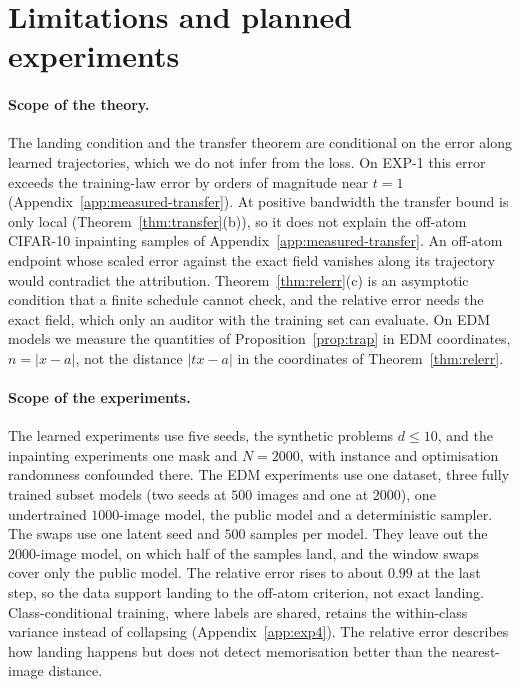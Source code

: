 \documentclass{article} %
\theoremstyle{plain}
\theoremstyle{definition}
\theoremstyle{remark}
\begin{document}
\FloatBarrier

\section{Limitations and planned experiments}
\label{sec:limitations}

\paragraph{Scope of the theory.} The landing condition and the transfer theorem are conditional on
the error along learned trajectories, which we do not infer from the loss. On EXP-1 this error
exceeds the training-law error by orders of magnitude near $t=1$
(Appendix~\ref{app:measured-transfer}). At positive bandwidth the transfer bound is only local
(Theorem~\ref{thm:transfer}(b)), so it does not explain the off-atom CIFAR-10 inpainting
samples of Appendix~\ref{app:measured-transfer}. An off-atom endpoint whose scaled error against
the exact field vanishes along its trajectory would contradict the attribution.
Theorem~\ref{thm:relerr}(c) is an asymptotic condition that a finite schedule cannot check, and
the relative error needs the exact field, which only an auditor with the training set can
evaluate. On EDM models we measure the quantities of Proposition~\ref{prop:trap} in EDM
coordinates, $n=|x-a|$, not the distance $|tx-a|$ in the coordinates of Theorem~\ref{thm:relerr}.

\paragraph{Scope of the experiments.} The learned experiments use five seeds, the synthetic
problems $d\le10$, and the inpainting experiments one mask and $N{=}2000$, with instance and
optimisation randomness confounded there. The EDM experiments use one dataset, three fully trained
subset models (two seeds at $500$ images and one at $2000$), one undertrained $1000$-image model,
the public model and a deterministic sampler. The swaps use one latent seed and $500$ samples per
model. They leave out the $2000$-image model, on which half of the samples land, and the window
swaps cover only the public model. The relative error rises to about $0.99$ at the last step, so
the data support landing to the off-atom criterion, not exact landing. Class-conditional training,
where labels are shared, retains the within-class variance instead of collapsing
(Appendix~\ref{app:exp4}). The relative error describes how landing happens but does not detect
memorisation better than the nearest-image distance.
\end{document}
